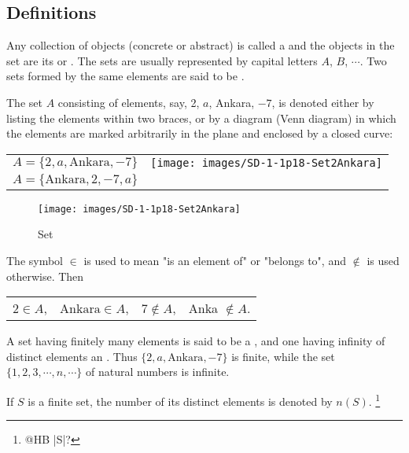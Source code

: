 \documentclass[11pt]{amsbook}
\begin{document}
\subsection{Definitions} 
\label{subsec:Definitions}

\begin{defn}
	Any collection of objects (concrete or abstract) is called 
	a  and 
	the objects in the set are its  
	or .
	The sets are usually represented by capital letters 
	$A$, $B$, $\cdots$. 
	Two sets formed by the same elements are 
	said to be .
\end{defn}


The set $A$ consisting of elements, say, 2, $a$, Ankara, $-7$, is denoted either by listing the elements within two braces, or by a diagram (Venn diagram) in which the elements
are marked arbitrarily in the plane and enclosed by a closed curve:

\begin{tabular}{ll} 
	$A = \{2, a, \text{Ankara}, -7\}$
		&\texttt{[image: images/SD-1-1p18-Set2Ankara]}
\\
	$A = \{\text{Ankara}, 2, -7, a\}$
\end{tabular}

\begin{figure}[htb]
	\centering
	\texttt{[image: images/SD-1-1p18-Set2Ankara]}
	\caption{Set}
	\label{fig:Set2Ankara}
\end{figure}

The symbol 
$\in$ is used to mean "is an element of" or "belongs to", and 
$\notin$ is used otherwise. 
Then
\begin{center}
\begin{tabular}{cccc}
	$2 \in A$, \quad
	& $\text{Ankara} \in A$, \quad
	& $7 \notin A$, \quad
	& Anka $\notin A$. 
\end{tabular}
\end{center}

A set having finitely many elements is said to be a 
, 
and one having infinity of distinct elements an 
. 
Thus 
$\{ 2, a, \text{Ankara}, -7 \}$ 
is finite, while the set 
$\{ 1, 2, 3, \cdots, n, \cdots \}$ of natural numbers is infinite.

If $S$ is a finite set, 
the number of its distinct elements is denoted by $n(S)$.
\footnote{@HB |S|?}
\end{document}
